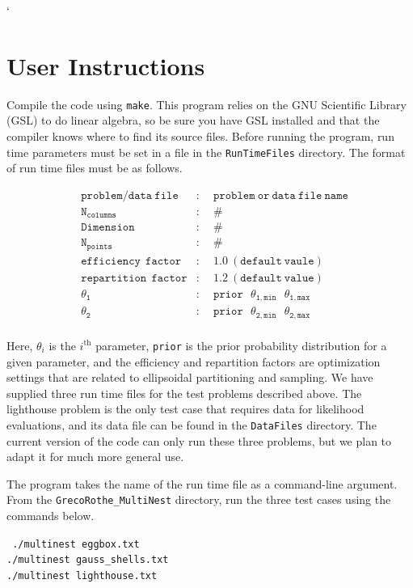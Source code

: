 `\documentclass{article}
\def\mtt{\mathtt}
\def\mrm{\mathrm}
\begin{document}
\section{User Instructions}
Compile the code using {\tt make}.  This program relies on the GNU Scientific Library (GSL) to do linear algebra, so be sure  you have GSL installed and that the compiler knows where to find its source files. Before running the program, run time parameters must be set in a file in the {\tt RunTimeFiles} directory. The format of run time files must be as follows. 

\begin{align*}
&\mtt{problem/data \ file}    &:& \ \ \mtt{problem \ or \ data \ file \ name}\\
&\mtt{N_{columns}}  	     &:& \ \ \mtt{\#}\\       
&\mtt{Dimension} 	            &:& \ \ \mtt{\# }\\
&\mtt{N_{points}}                &:& \ \ \mtt{\#}\\
&\mtt{efficiency \  \ factor}   &:& \ \ \mtt{1.0 \ (default \ vaule)}\\  
&\mtt{repartition \  \ factor}  &:& \ \ \mtt{1.2 \ (default \ value)}\\
&\mtt{\theta_1}                    &:& \ \ \mtt{prior \  \ \  \theta_{1,min}  \  \ \ \theta_{1,max}}\\     
&\mtt{\theta_2}                    &:& \ \ \mtt{prior \  \  \ \theta_{2,min}  \  \ \  \theta_{2,max}}\\     
\end{align*}

\noindent Here, $\theta_i$ is the $i^\mrm{th}$ parameter, {\tt prior} is the prior probability distribution for a given parameter, and the efficiency and repartition factors are optimization settings that are related to ellipsoidal partitioning and sampling. We have supplied three run time files for the test problems described above. The lighthouse problem is the only test case that requires data for likelihood evaluations, and its data file can be found in the {\tt DataFiles} directory. The current version of the code can only run these three problems, but we plan to adapt it for much more general use. 

The program takes the name of the run time file as a command-line argument. From the {\tt GrecoRothe\_MultiNest} directory, run the three test cases using the commands below.

\begin{adjustwidth*}{3.6cm}{3.5cm}
 {\tt 
 ./multinest eggbox.txt\\
./multinest gauss\_shells.txt\\
 ./multinest lighthouse.txt\\
 }
 \end{adjustwidth*}
 
\end{document}
